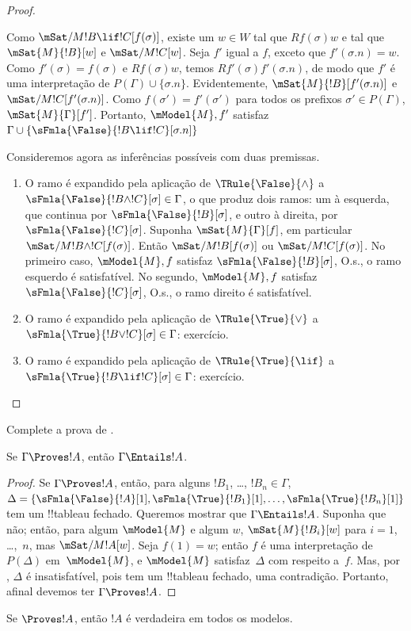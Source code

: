 \documentclass[../../../include/open-logic-section]{subfiles}
\begin{document}
\begin{proof}
\begin{enumerate}
  Como $\mSat/{M}{!B \lif !C}[f(\sigma)]$, existe um $w \in W$ tal
  que $Rf(\sigma)w$ e tal que $\mSat{M}{!B}[w]$ e
  $\mSat/{M}{!C}[w]$. Seja $f'$ igual a $f$, exceto que $f'(\sigma.n)
  = w$. Como $f'(\sigma) = f(\sigma)$ e $Rf(\sigma)w$, temos
  $Rf'(\sigma)f'(\sigma.n)$, de modo que $f'$ é uma interpretação de
  $P(\Gamma) \cup \{\sigma.n\}$. Evidentemente,
  $\mSat{M}{!B}[f'(\sigma.n)]$ e $\mSat/{M}{!C}[f'(\sigma.n)]$.
  Como $f(\sigma') = f'(\sigma')$ para todos os prefixos $\sigma' \in
  P(\Gamma)$, $\mSat{M}{\Gamma}[f']$. Portanto, $\mModel{M}, f'$ satisfaz
  $\Gamma \cup \{\sFmla{\False}{!B \lif !C}[\sigma.n]\}$
\end{enumerate}
Consideremos agora as inferências possíveis com duas premissas.
\begin{enumerate}
\item O ramo é expandido pela aplicação de $\TRule{\False}{\land}$ a
  $\sFmla{\False}{!B \land !C}[\sigma] \in \Gamma$, o que produz
  dois ramos: um à esquerda, que continua por
  $\sFmla{\False}{!B}[\sigma]$, e outro à direita, por
  $\sFmla{\False}{!C}[\sigma]$. Suponha $\mSat{M}{\Gamma}[f]$, em
  particular $\mSat/{M}{!B \land !C}[f(\sigma)]$. Então
  $\mSat/{M}{!B}[f(\sigma)]$ ou $\mSat/{M}{!C}[f(\sigma)]$. No
  primeiro caso, $\mModel{M}, f$ satisfaz $\sFmla{\False}{!B}[\sigma]$,
  O.s.\@, o ramo esquerdo é satisfatível. No segundo, $\mModel{M}, f$
  satisfaz $\sFmla{\False}{!C}[\sigma]$, O.s.\@, o ramo direito é
  satisfatível.
\item O ramo é expandido pela aplicação de $\TRule{\True}{\lor}$ a
    $\sFmla{\True}{!B \lor !C}[\sigma] \in \Gamma$: exercício.
\item O ramo é expandido pela aplicação de $\TRule{\True}{\lif}$ a
    $\sFmla{\True}{!B \lif !C}[\sigma] \in \Gamma$: exercício.
\end{enumerate}
\end{proof}

\begin{prob}
Complete a prova de .
\end{prob}

\begin{cor}
Se $\Gamma \Proves !A$, então $\Gamma \Entails !A$.
\end{cor}

\begin{proof}
  Se $\Gamma \Proves !A$, então, para alguns $!B_1$, \dots, $!B_n \in
  \Gamma$, $\Delta = \{\sFmla{\False}{!A}[1], \sFmla{\True}{!B_1}[1],
  \dots, \sFmla{\True}{!B_n}[1]\}$ tem um !!{tableau} fechado. Queremos
  mostrar que $\Gamma \Entails !A$. Suponha que não; então, para algum
  $\mModel{M}$ e algum $w$, $\mSat{M}{!B_i}[w]$ para $i=1$, \dots,~$n$, mas
  $\mSat/{M}{!A}[w]$. Seja $f(1) = w$; então $f$ é uma interpretação
  de~$P(\Delta)$ em~$\mModel{M}$, e $\mModel{M}$ satisfaz~$\Delta$ com
  respeito a~$f$. Mas, por , $\Delta$ é
  insatisfatível, pois tem um !!{tableau} fechado, uma
  contradição. Portanto, afinal devemos ter $\Gamma \Proves !A$.
\end{proof}

\begin{cor}
Se $\Proves !A$, então $!A$ é verdadeira em todos os modelos.
\end{cor}
\end{document}
